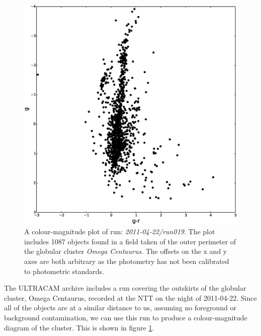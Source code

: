 \begin{figure}
\centering
\includegraphics[width=120mm]{images/2011-04-22-run019-omegacen-colourmagnitude.eps}
\caption{A colour-magnitude plot of run: \emph{2011-04-22/run019}. The plot includes 1087 objects found in a field taken of the outer perimeter of the globular cluster \emph{Omega Centaurus}. The offsets on the x and y axes are both arbitrary as the photometry has not been calibrated to photometric standards. }
\label{fig:OmegaCen-colourmagnitude}
\end{figure}

The ULTRACAM archive includes a run covering the outskirts of the globular cluster, Omega Centaurus, recorded at the NTT on the night of 2011-04-22.  Since all of the objects are at a similar distance to us, assuming no foreground or background contamination, we can use this run to produce a colour-magnitude diagram of the cluster. This is shown in  figure \ref{fig:OmegaCen-colourmagnitude}. 



